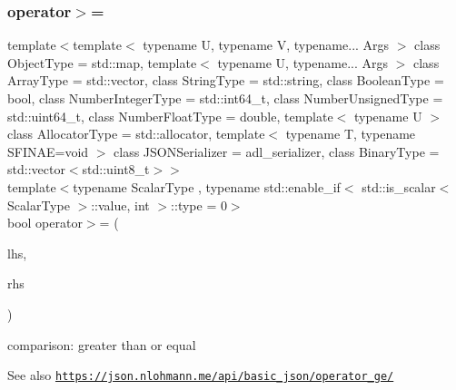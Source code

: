 \subsubsection{\texorpdfstring{operator$>$=}{operator>=}\hspace{0.1cm}{\footnotesize\ttfamily [2/3]}}
{\footnotesize\ttfamily template$<$template$<$ typename U, typename V, typename... Args $>$ class Object\+Type = std\+::map, template$<$ typename U, typename... Args $>$ class Array\+Type = std\+::vector, class String\+Type  = std\+::string, class Boolean\+Type  = bool, class Number\+Integer\+Type  = std\+::int64\+\_\+t, class Number\+Unsigned\+Type  = std\+::uint64\+\_\+t, class Number\+Float\+Type  = double, template$<$ typename U $>$ class Allocator\+Type = std\+::allocator, template$<$ typename T, typename S\+F\+I\+N\+A\+E=void $>$ class J\+S\+O\+N\+Serializer = adl\+\_\+serializer, class Binary\+Type  = std\+::vector$<$std\+::uint8\+\_\+t$>$$>$ \\
template$<$typename Scalar\+Type , typename std\+::enable\+\_\+if$<$ std\+::is\+\_\+scalar$<$ Scalar\+Type $>$\+::value, int $>$\+::type  = 0$>$ \\
bool operator$>$= (\begin{DoxyParamCaption}\item[{\hyperlink{classnlohmann_1_1basic__json_ab8a1c33ee7b154fc41ca2545aa9724e6}{const\+\_\+reference}}]{lhs,  }\item[{Scalar\+Type}]{rhs }\end{DoxyParamCaption})\hspace{0.3cm}{\ttfamily [friend]}}



comparison\+: greater than or equal 

\begin{DoxySeeAlso}{See also}
\href{https://json.nlohmann.me/api/basic_json/operator_ge/}{\tt https\+://json.\+nlohmann.\+me/api/basic\+\_\+json/operator\+\_\+ge/} 
\end{DoxySeeAlso}
\mbox{\label{classnlohmann_1_1basic__json_a94c61e0128f0794e7a34e1aecee5c445}} 
